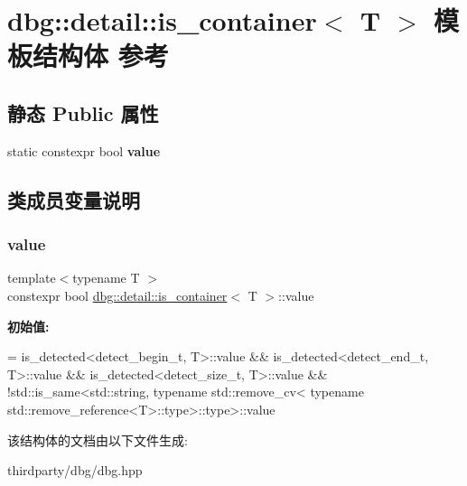 \hypertarget{structdbg_1_1detail_1_1is__container}{}\section{dbg\+:\+:detail\+:\+:is\+\_\+container$<$ T $>$ 模板结构体 参考}
\label{structdbg_1_1detail_1_1is__container}
\subsection*{静态 Public 属性}
\begin{DoxyCompactItemize}
\item 
static constexpr bool {\bfseries value}
\end{DoxyCompactItemize}


\subsection{类成员变量说明}
\mbox{\label{structdbg_1_1detail_1_1is__container_aa9a4594488352384b65b36198ac414f8}} 
\subsubsection{\texorpdfstring{value}{value}}
{\footnotesize\ttfamily template$<$typename T $>$ \\
constexpr bool \hyperlink{structdbg_1_1detail_1_1is__container}{dbg\+::detail\+::is\+\_\+container}$<$ T $>$\+::value\hspace{0.3cm}{\ttfamily [static]}}

{\bfseries 初始值\+:}
\begin{DoxyCode}
=
      is\_detected<detect\_begin\_t, T>::value &&
      is\_detected<detect\_end\_t, T>::value &&
      is\_detected<detect\_size\_t, T>::value &&
      !std::is\_same<std::string,
                    \textcolor{keyword}{typename} std::remove\_cv<
                        \textcolor{keyword}{typename} std::remove\_reference<T>::type>::type>::value
\end{DoxyCode}


该结构体的文档由以下文件生成\+:\begin{DoxyCompactItemize}
\item 
thirdparty/dbg/dbg.\+hpp\end{DoxyCompactItemize}
